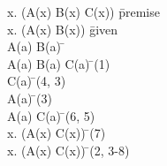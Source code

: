 \documentclass{article}
\begin{document}
\begin{proofbox}
\: \forall x. (A(x) \land B(x) \rightarrow C(x)) \= \hbox{premise} \\
\: \exists x. (A(x) \land B(x)) \= \hbox{given} \\
\open
\: A(a) \land B(a) \= \asm \\
\: A(a) \land B(a) \rightarrow C(a) \= \forallelim(1) \\
\: C(a) \= \implieselim(4, 3) \\
\: A(a) \= \andelim(3) \\
\: A(a) \land C(a) \= \andintro(6, 5) \\
\: \exists x. (A(x) \land C(x)) \= \existsintro(7) \\
\close
\: \exists x. (A(x) \land C(x)) \= \existselim(2, 3-8) \\
\end{proofbox}
\end{document}
